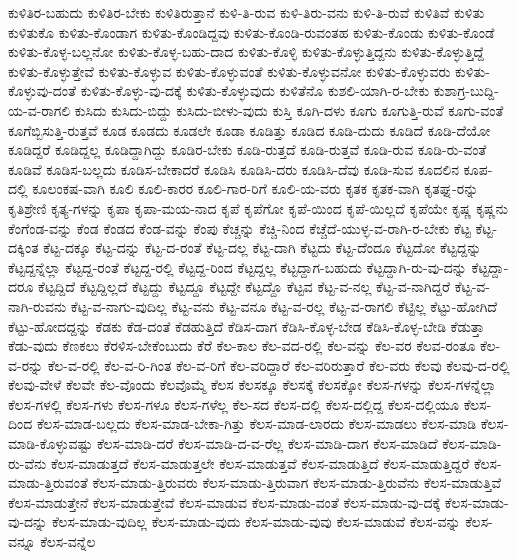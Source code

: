{ಕುಳಿತಿರ-ಬಹುದು
ಕುಳಿತಿರ-ಬೇಕು
ಕುಳಿತಿರುತ್ತಾನೆ
ಕುಳಿ-ತಿ-ರುವ
ಕುಳಿ-ತಿರು-ವನು
ಕುಳಿ-ತಿ-ರುವೆ
ಕುಳಿತಿವೆ
ಕುಳಿತು
ಕುಳಿತುಕೊ
ಕುಳಿತು-ಕೊಂಡಾಗ
ಕುಳಿತು-ಕೊಂಡಿದ್ದವು
ಕುಳಿತು-ಕೊಂಡಿ-ರುವಂತಹ
ಕುಳಿತು-ಕೊಂಡು
ಕುಳಿತು-ಕೊಂಡೆ
ಕುಳಿತು-ಕೊಳ್ಳ-ಬಲ್ಲನೋ
ಕುಳಿತು-ಕೊಳ್ಳ-ಬಹು-ದಾದ
ಕುಳಿತು-ಕೊಳ್ಳಿ
ಕುಳಿತು-ಕೊಳ್ಳುತ್ತಿದ್ದನು
ಕುಳಿತು-ಕೊಳ್ಳುತ್ತಿದ್ದೆ
ಕುಳಿತು-ಕೊಳ್ಳುತ್ತೇವೆ
ಕುಳಿತು-ಕೊಳ್ಳುವ
ಕುಳಿತು-ಕೊಳ್ಳುವಂತೆ
ಕುಳಿತು-ಕೊಳ್ಳುವನೋ
ಕುಳಿತು-ಕೊಳ್ಳುವರು
ಕುಳಿತು-ಕೊಳ್ಳುವು-ದಂತೆ
ಕುಳಿತು-ಕೊಳ್ಳು-ವು-ದಕ್ಕೆ
ಕುಳಿತು-ಕೊಳ್ಳುವುದು
ಕುಳಿತೆನೊ
ಕುಶಲಿ-ಯಾಗಿ-ರ-ಬೇಕು
ಕುಶಾಗ್ರ-ಬುದ್ದಿ-ಯ-ವ-ರಾಗಲಿ
ಕುಸಿದು
ಕುಸಿದು-ಬಿದ್ದು
ಕುಸಿದು-ಬೀಳು-ವುದು
ಕುಸ್ತಿ
ಕೂಗಿ-ದಳು
ಕೂಗು
ಕೂಗುತ್ತಿ-ರುವೆ
ಕೂಗು-ವಂತೆ
ಕೂಗೆಬ್ಬಿಸುತ್ತಿ-ರುತ್ತವೆ
ಕೂಡ
ಕೂಡದು
ಕೂಡಲೇ
ಕೂಡಾ
ಕೂಡಿತ್ತು
ಕೂಡಿದ
ಕೂಡಿ-ದುದು
ಕೂಡಿದೆ
ಕೂಡಿ-ದೆಯೋ
ಕೂಡಿದ್ದರೆ
ಕೂಡಿದ್ದಲ್ಲ
ಕೂಡಿದ್ದಾಗಿದ್ದು
ಕೂಡಿರ-ಬೇಕು
ಕೂಡಿ-ರುತ್ತದೆ
ಕೂಡಿ-ರುತ್ತವೆ
ಕೂಡಿ-ರುವ
ಕೂಡಿ-ರು-ವಂತೆ
ಕೂಡಿವೆ
ಕೂಡಿಸ-ಬಲ್ಲದು
ಕೂಡಿಸ-ಬೇಕಾದರೆ
ಕೂಡಿಸಿ
ಕೂಡಿಸಿ-ದರು
ಕೂಡಿಸಿ-ದೆವು
ಕೂಡಿ-ಸುವ
ಕೂದಲಿನ
ಕೂಪ-ದಲ್ಲಿ
ಕೂಲಂಕಷ-ವಾಗಿ
ಕೂಲಿ
ಕೂಲಿ-ಕಾರರ
ಕೂಲಿ-ಗಾರ-ರಿಗೆ
ಕೂಲಿ-ಯ-ವರು
ಕೃತಕ
ಕೃತಕ-ವಾಗಿ
ಕೃತಘ್ನ-ರನ್ನು
ಕೃತಿಶ್ರೇಣಿ
ಕೃತ್ಯ-ಗಳನ್ನು
ಕೃಪಾ
ಕೃಪಾ-ಮಯ-ನಾದ
ಕೃಪೆ
ಕೃಪೆಗೋ
ಕೃಪೆ-ಯಿಂದ
ಕೃಪೆ-ಯಿಲ್ಲದೆ
ಕೃಪೆಯೇ
ಕೃಷ್ಣ
ಕೃಷ್ಣನು
ಕೆಂಗೆಂಡ-ವನ್ನು
ಕೆಂಡ
ಕೆಂಡದ
ಕೆಂಡ-ವನ್ನು
ಕೆಂಪು
ಕೆಚ್ಚನ್ನು
ಕೆಚ್ಚಿ-ನಿಂದ
ಕೆಚ್ಚೆದೆ-ಯುಳ್ಳ-ವ-ರಾಗಿ-ರ-ಬೇಕು
ಕೆಟ್ಟ
ಕೆಟ್ಟ-ದಕ್ಕಿಂತ
ಕೆಟ್ಟ-ದಕ್ಕೂ
ಕೆಟ್ಟ-ದನ್ನು
ಕೆಟ್ಟ-ದ-ರಂತೆ
ಕೆಟ್ಟ-ದಲ್ಲ
ಕೆಟ್ಟ-ದಾಗಿ
ಕೆಟ್ಟದು
ಕೆಟ್ಟ-ದೆಂದೂ
ಕೆಟ್ಟದೋ
ಕೆಟ್ಟದ್ದನ್ನು
ಕೆಟ್ಟದ್ದನ್ನೆಲ್ಲಾ
ಕೆಟ್ಟದ್ದ-ರಂತೆ
ಕೆಟ್ಟದ್ದ-ರಲ್ಲಿ
ಕೆಟ್ಟದ್ದ-ರಿಂದ
ಕೆಟ್ಟದ್ದಲ್ಲ
ಕೆಟ್ಟದ್ದಾಗ-ಬಹುದು
ಕೆಟ್ಟದ್ದಾಗಿ-ರು-ವು-ದನ್ನು
ಕೆಟ್ಟದ್ದಾ-ದರೂ
ಕೆಟ್ಟದ್ದಿದೆ
ಕೆಟ್ಟದ್ದಿಲ್ಲದೆ
ಕೆಟ್ಟದ್ದು
ಕೆಟ್ಟದ್ದೂ
ಕೆಟ್ಟದ್ದೇ
ಕೆಟ್ಟದ್ದೊ
ಕೆಟ್ಟವ
ಕೆಟ್ಟ-ವ-ನಲ್ಲ
ಕೆಟ್ಟ-ವ-ನಾಗಿದ್ದರೆ
ಕೆಟ್ಟ-ವ-ನಾಗಿ-ರುವನು
ಕೆಟ್ಟ-ವ-ನಾಗು-ವುದಿಲ್ಲ
ಕೆಟ್ಟ-ವನು
ಕೆಟ್ಟ-ವನೂ
ಕೆಟ್ಟ-ವ-ರಲ್ಲ
ಕೆಟ್ಟ-ವ-ರಾಗಲಿ
ಕೆಟ್ಟಿಲ್ಲ
ಕೆಟ್ಟು-ಹೋಗಿದೆ
ಕೆಟ್ಟು-ಹೋದದ್ದನ್ನು
ಕೆಡಕು
ಕೆಡ-ದಂತೆ
ಕೆಡಹುತ್ತಿದೆ
ಕೆಡಿಸ-ದಾಗ
ಕೆಡಿಸಿ-ಕೊಳ್ಳ-ಬೇಡ
ಕೆಡಿಸಿ-ಕೊಳ್ಳ-ಬೇಡಿ
ಕೆಡುತ್ತಾ
ಕೆಡು-ವುದು
ಕೆಣಕಲು
ಕೆರಳಿಸ-ಬೇಕೆಂಬುದು
ಕೆರೆ
ಕೆಲ-ಕಾಲ
ಕೆಲ-ವದ-ರಲ್ಲಿ
ಕೆಲ-ವನ್ನು
ಕೆಲ-ವರ
ಕೆಲವ-ರಂತೂ
ಕೆಲ-ವ-ರನ್ನು
ಕೆಲ-ವ-ರಲ್ಲಿ
ಕೆಲ-ವ-ರಿ-ಗಿಂತ
ಕೆಲ-ವ-ರಿಗೆ
ಕೆಲ-ವರಿದ್ದಾರೆ
ಕೆಲ-ವರಿರುತ್ತಾರೆ
ಕೆಲ-ವರು
ಕೆಲವು
ಕೆಲವು-ದ-ರಲ್ಲಿ
ಕೆಲವು-ವೇಳೆ
ಕೆಲವೇ
ಕೆಲ-ವೊಂದು
ಕೆಲವೊಮ್ಮೆ
ಕೆಲಸ
ಕೆಲಸಕ್ಕೂ
ಕೆಲಸಕ್ಕೆ
ಕೆಲಸಕ್ಕೋ
ಕೆಲಸ-ಗಳನ್ನು
ಕೆಲಸ-ಗಳನ್ನೆಲ್ಲಾ
ಕೆಲಸ-ಗಳಲ್ಲಿ
ಕೆಲಸ-ಗಳು
ಕೆಲಸ-ಗಳೂ
ಕೆಲಸ-ಗಳೆಲ್ಲ
ಕೆಲ-ಸದ
ಕೆಲಸ-ದಲ್ಲಿ
ಕೆಲಸ-ದಲ್ಲಿದ್ದ
ಕೆಲಸ-ದಲ್ಲಿಯೂ
ಕೆಲಸ-ದಿಂದ
ಕೆಲಸ-ಮಾಡ-ಬಲ್ಲದು
ಕೆಲಸ-ಮಾಡ-ಬೇಕಾ-ಗಿತ್ತು
ಕೆಲಸ-ಮಾಡ-ಲಾರದು
ಕೆಲಸ-ಮಾಡಲು
ಕೆಲಸ-ಮಾಡಿ
ಕೆಲಸ-ಮಾಡಿ-ಕೊಳ್ಳುವಷ್ಟು
ಕೆಲಸ-ಮಾಡಿ-ದರೆ
ಕೆಲಸ-ಮಾಡಿ-ದ-ವ-ರೆಲ್ಲ
ಕೆಲಸ-ಮಾಡಿ-ದಾಗ
ಕೆಲಸ-ಮಾಡಿದೆ
ಕೆಲಸ-ಮಾಡಿ-ರು-ವೆನು
ಕೆಲಸ-ಮಾಡುತ್ತದೆ
ಕೆಲಸ-ಮಾಡುತ್ತಲೇ
ಕೆಲಸ-ಮಾಡುತ್ತವೆ
ಕೆಲಸ-ಮಾಡುತ್ತಿದೆ
ಕೆಲಸ-ಮಾಡುತ್ತಿದ್ದರೆ
ಕೆಲಸ-ಮಾಡು-ತ್ತಿರುವಂತೆ
ಕೆಲಸ-ಮಾಡು-ತ್ತಿರುವರು
ಕೆಲಸ-ಮಾಡು-ತ್ತಿರುವಾಗ
ಕೆಲಸ-ಮಾಡು-ತ್ತಿರುವೆನು
ಕೆಲಸ-ಮಾಡುತ್ತಿವೆ
ಕೆಲಸ-ಮಾಡುತ್ತೇನೆ
ಕೆಲಸ-ಮಾಡುತ್ತೇವೆ
ಕೆಲಸ-ಮಾಡುವ
ಕೆಲಸ-ಮಾಡು-ವಂತೆ
ಕೆಲಸ-ಮಾಡು-ವು-ದಕ್ಕೆ
ಕೆಲಸ-ಮಾಡು-ವು-ದನ್ನು
ಕೆಲಸ-ಮಾಡು-ವುದಿಲ್ಲ
ಕೆಲಸ-ಮಾಡು-ವುದು
ಕೆಲಸ-ಮಾಡು-ವುವು
ಕೆಲಸ-ಮಾಡುವೆ
ಕೆಲಸ-ವನ್ನು
ಕೆಲಸ-ವನ್ನೂ
ಕೆಲಸ-ವನ್ನೆಲ
}
